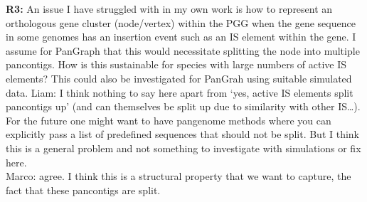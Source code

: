 \documentclass[aps,rmp,onecolumn]{revtex4-1}
\newcommand{\Marco}[1]{{\color{gray}Marco: #1}}
\newcommand{\Liam}[1]{{\color{teal}Liam: #1}}
\newcommand{\reviewer}[2]{\textbf{#1:} #2\vskip 5mm}
\begin{document}
\reviewer{R3}{An issue I have struggled with in my own work is how to represent an orthologous gene cluster (node/vertex) within the PGG when the gene sequence in some genomes has an insertion event such as an IS element within the gene. I assume for PanGraph that this would necessitate splitting the node into multiple pancontigs. How is this sustainable for species with large numbers of active IS elements? This could also be investigated for PanGrah using suitable simulated data.}
\Liam{I think nothing to say here apart from `yes, active IS elements split pancontigs up' (and can themselves be split up due to similarity with other IS\ldots). For the future one might want to have pangenome methods where you can explicitly pass a list of predefined sequences that should not be split. But I think this is a general problem and not something to investigate with simulations or fix here.}\\
\Marco{agree. I think this is a structural property that we want to capture, the fact that these pancontigs are split.}


{}
\end{document}
